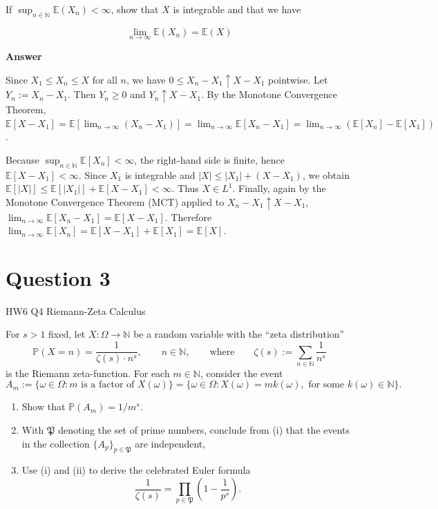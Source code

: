 \documentclass[letterpaper]{article}
\begin{document}
		If $\sup _{n \in \mathbb{N}} \mathbb{E}\left(X_{n}\right)<\infty$, show that $X$ is integrable and that we have
		
		$$
		\lim _{n \rightarrow \infty} \mathbb{E}\left(X_{n}\right)=\mathbb{E}(X)
		$$
		
		\textbf{Answer}
		
		Since $X_1 \le X_n \le X$ for all $n$, we have
		$0 \le X_n - X_1 \uparrow X - X_1$ pointwise. Let $Y_n := X_n - X_1$. Then $Y_n \ge 0$ and $Y_n \uparrow X - X_1$.  
		By the Monotone Convergence Theorem,
		$\mathbb{E}[X - X_1] = \mathbb{E}[\lim_{n\to\infty} (X_n - X_1)]
		= \lim_{n\to\infty} \mathbb{E}[X_n - X_1]
		= \lim_{n\to\infty}(\mathbb{E}[X_n] - \mathbb{E}[X_1])$.
		
		Because $\sup_{n\in\mathbb{N}} \mathbb{E}[X_n] < \infty$, the right-hand side is finite, hence
		$\mathbb{E}[X - X_1] < \infty$. Since $X_1$ is integrable and $|X| \le |X_1| + (X - X_1)$, we obtain
		$\mathbb{E}[|X|] \le \mathbb{E}[|X_1|] + \mathbb{E}[X - X_1] < \infty$.
		Thus $X \in L^1$. Finally, again by the Monotone Convergence Theorem (MCT) applied to $X_n - X_1 \uparrow X - X_1$,
		$\lim_{n\to\infty} \mathbb{E}[X_n - X_1] = \mathbb{E}[X - X_1]$. Therefore
		$\lim_{n\to\infty} \mathbb{E}[X_n]
		= \mathbb{E}[X - X_1] + \mathbb{E}[X_1]
		= \mathbb{E}[X]$.
			
		
		\clearpage
		
		\section{Question 3}
		
		{\color{deepred} HW6 Q4 Riemann-Zeta Calculus} 
		
		For $s>1$ fixed, let $X:\Omega\to\mathbb{N}$ be a random variable with the ``zeta distribution''
		\[
		\mathbb{P}(X=n)=\frac{1}{\zeta(s)\cdot n^{s}}, \qquad n\in\mathbb{N}, 
		\qquad \text{where} \qquad 
		\zeta(s):=\sum_{n\in\mathbb{N}}\frac{1}{n^{s}}
		\]
		is the Riemann zeta-function. For each $m\in\mathbb{N}$, consider the event
		\[
		A_m:=\{\omega\in\Omega: m \text{ is a factor of } X(\omega)\}
		=\{\omega\in\Omega: X(\omega)=m k(\omega), \text{ for some } k(\omega)\in\mathbb{N}\}.
		\]
		
		\begin{enumerate}
			\item[(i)] Show that $\mathbb{P}(A_m)=1/m^{s}$.
			
			\item[(ii)] With $\mathfrak{P}$ denoting the set of prime numbers, conclude from (i) that the events in the collection $\{A_p\}_{p\in\mathfrak{P}}$ are independent,
			
			\item[(iii)] Use (i) and (ii) to derive the celebrated Euler formula
			\[
			\frac{1}{\zeta(s)}=\prod_{p\in\mathfrak{P}}\left(1-\frac{1}{p^{s}}\right).
			\]
		\end{enumerate}
		
\end{document}
